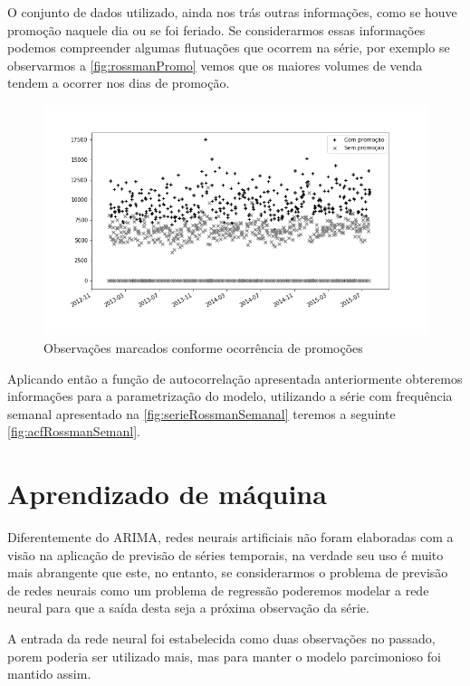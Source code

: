 \documentclass[
    12pt,
    oneside,
    a4paper,
    english,
    brazil
]{abntex2}
\begin{document}
O conjunto de dados utilizado, ainda nos trás outras informações, como se houve
promoção naquele dia ou se foi feriado. Se considerarmos essas informações
podemos compreender algumas flutuações que ocorrem na série, por exemplo se
observarmos a \autoref{fig:rossmanPromo} vemos que os maiores volumes de venda
tendem a ocorrer nos dias de promoção.

\begin{figure}
    \centering
    \caption{Observações marcados conforme ocorrência de promoções}
    \includegraphics[width=.7\textwidth]{images/graficoRossmanPromo.png}
\end{figure}

Aplicando então a função de autocorrelação apresentada anteriormente obteremos
informações para a parametrização do modelo, utilizando a série com frequência
semanal apresentado na \autoref{fig:serieRossmanSemanal} teremos a seguinte
\autoref{fig:acfRossmanSemanl}.


\section{Aprendizado de máquina}

Diferentemente do ARIMA, redes neurais artificiais não foram elaboradas com a
visão na aplicação de previsão de séries temporais, na verdade seu uso é muito
mais abrangente que este, no entanto, se considerarmos o problema de previsão de
redes neurais como um problema de regressão poderemos modelar a rede neural para
que a saída desta seja a próxima observação da série.

A entrada da rede neural foi estabelecida como duas observações no passado,
porem poderia ser utilizado mais, mas para manter o modelo parcimonioso foi
mantido assim.
\end{document}
